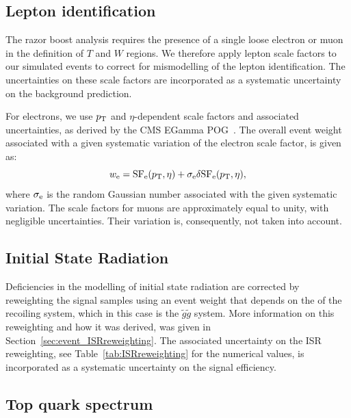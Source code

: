 \subsection{Lepton identification \label{sec:boost_leptonID}} 

The razor boost analysis requires the presence of a single loose electron or muon in the definition
of $T$ and $W$ regions. We therefore apply lepton scale factors to our simulated events to correct
for mismodelling of the lepton identification. The uncertainties on these scale factors are
incorporated as a systematic uncertainty on the background prediction.  

For electrons, we use $p_{\mathrm{T}}$ and $\eta$-dependent scale factors and associated uncertainties, as
derived by the CMS EGamma POG~\cite{ElectronSF}.
The overall event weight associated with a given systematic variation of the electron scale
factor, is given as:
\begin{equation}
w_{\rm e} = {\rm SF_{e}}(p_{\mathrm{T}}, \eta) + \sigma_{\rm e} \delta {\rm SF_{e}}(p_{\mathrm{T}}, \eta), 
\end{equation}
where $\sigma_{\rm e}$ is the random Gaussian number associated with the given systematic variation.
The scale factors for muons are approximately equal to unity, with negligible uncertainties. Their
variation is, consequently, not taken into account.

\subsection{Initial State Radiation} 

Deficiencies in the modelling of initial state radiation are corrected by reweighting the
signal samples using an event weight that depends on the \pt of the recoiling system, which in this
case is the $\tilde{g}\tilde{g}$ system. 
More information on this reweighting and how it was derived, was given in
Section~\ref{sec:event_ISRreweighting}. 
The associated uncertainty on the ISR reweighting, see Table~\ref{tab:ISRreweighting} for the
numerical values, is incorporated as a systematic uncertainty on the signal efficiency. 

\subsection{Top quark \texorpdfstring{\pt}{pT} spectrum} 

